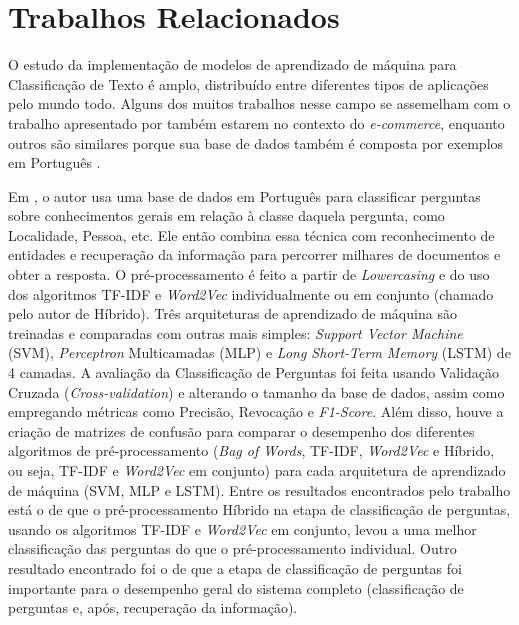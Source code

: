 \section{Trabalhos Relacionados}
\label{relacionados}
O estudo da implementação de modelos de aprendizado de máquina para Classificação de Texto é amplo, distribuído entre diferentes tipos de aplicações pelo mundo todo. Alguns dos muitos trabalhos nesse campo se assemelham com o trabalho apresentado por também estarem no contexto do \textit{e-commerce}, enquanto outros são similares porque sua base de dados também é composta por exemplos em Português \cite{survey}. 

Em \cite{relacionado_pt}, o autor usa uma base de dados em Português para classificar perguntas sobre conhecimentos gerais em relação à classe daquela pergunta, como Localidade, Pessoa, etc. Ele então combina essa técnica com reconhecimento de entidades e recuperação da informação para percorrer milhares de documentos e obter a resposta. O pré-processamento é feito a partir de \textit{Lowercasing} e do uso dos algoritmos TF-IDF e \textit{Word2Vec} \cite{word2vec} individualmente ou em conjunto (chamado pelo autor de Híbrido). Três arquiteturas de aprendizado de máquina são treinadas e comparadas com outras mais simples: \textit{Support Vector Machine} (SVM), \textit{Perceptron} Multicamadas (MLP) e \textit{Long Short-Term Memory} (LSTM) de 4 camadas. A avaliação da Classificação de Perguntas foi feita usando Validação Cruzada (\textit{Cross-validation}) e alterando o tamanho da base de dados, assim como empregando métricas como Precisão, Revocação e \textit{F1-Score}. Além disso, houve a criação de matrizes de confusão para comparar o desempenho dos diferentes algoritmos de pré-processamento (\textit{Bag of Words}, TF-IDF, \textit{Word2Vec} e Híbrido, ou seja, TF-IDF e \textit{Word2Vec} em conjunto) para cada arquitetura de aprendizado de máquina (SVM, MLP e LSTM). Entre os resultados encontrados pelo trabalho está o de que o pré-processamento Híbrido na etapa de classificação de perguntas, usando os algoritmos TF-IDF e \textit{Word2Vec} em conjunto, levou a uma melhor classificação das perguntas do que o pré-processamento individual. Outro resultado encontrado foi o de que a etapa de classificação de perguntas foi importante para o desempenho geral do sistema completo (classificação de perguntas e, após, recuperação da informação).

